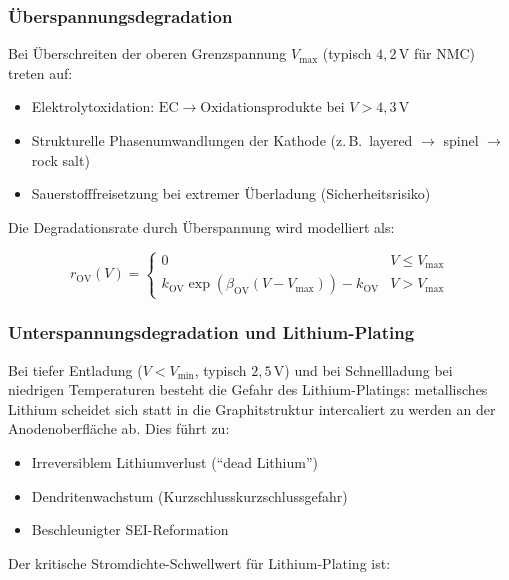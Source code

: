 ﻿\documentclass[12pt,a4paper]{article}
\begin{document}
	\subsubsection{Überspannungsdegradation}
	
	Bei Überschreiten der oberen Grenzspannung $V_\mathrm{max}$ (typisch
	$4{,}2\,\mathrm{V}$ für NMC) treten auf:
	
	\begin{itemize}
		\item Elektrolytoxidation: $\mathrm{EC} \rightarrow \text{Oxidationsprodukte}$ bei
		$V > 4{,}3\,\mathrm{V}$
		\item Strukturelle Phasenumwandlungen der Kathode (z.\,B.\ layered $\to$ spinel $\to$ rock salt)
		\item Sauerstofffreisetzung bei extremer Überladung (Sicherheitsrisiko)
	\end{itemize}
	
	Die Degradationsrate durch Überspannung wird modelliert als:
	
	\begin{equation}
		r_\mathrm{OV}(V) = \begin{cases}
			0 & V \leq V_\mathrm{max} \\
			k_\mathrm{OV} \exp\!\left(\beta_\mathrm{OV}(V - V_\mathrm{max})\right) - k_\mathrm{OV}
			& V > V_\mathrm{max}
		\end{cases}
		\label{eq:overvoltage_rate}
	\end{equation}
	
	\subsubsection{Unterspannungsdegradation und Lithium-Plating}
	
	Bei tiefer Entladung ($V < V_\mathrm{min}$, typisch $2{,}5\,\mathrm{V}$) und
	bei Schnellladung bei niedrigen Temperaturen besteht die Gefahr des Lithium-Platings:
	metallisches Lithium scheidet sich statt in die Graphitstruktur intercaliert zu werden
	an der Anodenoberfläche ab. Dies führt zu:
	
	\begin{itemize}
		\item Irreversiblem Lithiumverlust (``dead Lithium'')
		\item Dendritenwachstum (Kurzschlusskurzschlussgefahr)
		\item Beschleunigter SEI-Reformation
	\end{itemize}
	
	Der kritische Stromdichte-Schwellwert für Lithium-Plating ist:
	
\end{document}
